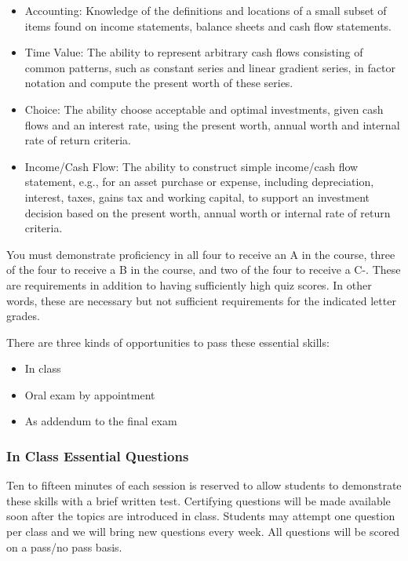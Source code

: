 \documentclass[letterpaper,10pt]{article}
\begin{document}
   \begin{itemize}
   
   \item Accounting: Knowledge of the definitions and locations of a
     small subset of items found on income statements, balance sheets and
     cash flow statements.
   
   \item Time Value: The ability to represent arbitrary cash flows
     consisting of common patterns, such as constant series and linear
     gradient series, in factor notation and compute the present worth of
     these series.
   
   \item Choice: The ability choose acceptable and optimal investments,
     given cash flows and an interest rate, using the present worth,
     annual worth and internal rate of return criteria.
   
   \item Income/Cash Flow: The ability to construct simple income/cash
     flow statement, e.g., for an asset purchase or expense, including
     depreciation, interest, taxes, gains tax and working capital, to
     support an investment decision based on the present worth, annual
     worth or internal rate of return criteria.
   \end{itemize}
   
  
  You must demonstrate proficiency in all four to receive an A in the course, three of the four to receive a B in the course, and two of the four to receive a C-.  These are requirements in addition to having sufficiently high quiz scores.  In other words, these are necessary but not sufficient requirements for the indicated letter grades.
  
  There are three kinds of opportunities to pass these essential skills:
  \begin{itemize}
      \item In class
      \item Oral exam by appointment
      \item As addendum to the final exam
  \end{itemize}
  
   
  \subsubsection{In Class Essential Questions}
  
  Ten to fifteen minutes of each session is reserved to allow students to demonstrate these skills with a brief written test. Certifying questions will be made available soon after the topics are introduced in class. Students may attempt one question per class and we will bring new questions every week.  All questions will be scored on a pass/no pass basis. 
  
\end{document}
